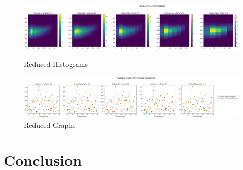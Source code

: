 \documentclass[12pt]{article}
\begin{document}
\begin{figure}[H]
	\centering
	\includegraphics[width=\linewidth]{reducedHist}
	\caption{Reduced Histograms}
	\label{fig:reducedHist}
	\includegraphics[width=\textwidth]{reducedGraph}
	\caption{Reduced Graphs}
	\label{fig:reducedGraph}
\end{figure}


\section{Conclusion}

\printbibliography
\end{document}
